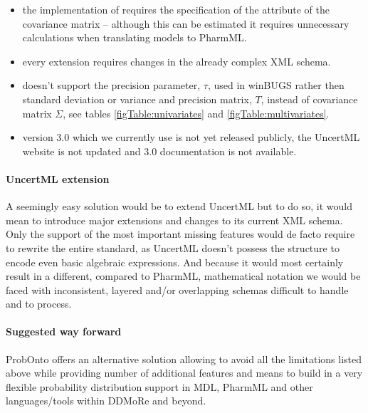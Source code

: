 \begin{itemize}
\item
the implementation of  requires the specification 
of the  attribute of the covariance matrix -- although this can be estimated
it requires unnecessary calculations when translating models to PharmML. 
\item
every extension requires changes in the already complex XML schema.
\item
doesn't support the precision parameter, $\tau$, used in winBUGS  
rather then standard deviation or variance and precision matrix, $T$, instead 
of covariance matrix $\Sigma$, see tables \ref{figTable:univariates} and \ref{figTable:multivariates}.
\item
version 3.0 which we currently use is not yet released publicly, the UncertML website 
is not updated and 3.0 documentation is not available.
\end{itemize}

\paragraph{UncertML extension} A seemingly easy solution would be to extend UncertML 
but to do so, it would mean to introduce major extensions and changes to its 
current XML schema. Only the support of the most important missing features would 
de facto require to rewrite the entire standard, as UncertML doesn't possess the 
structure to encode even basic algebraic expressions. And because it would most 
certainly result in a different, compared to PharmML, mathematical notation we would 
be faced with inconsistent, layered and/or overlapping schemas difficult to handle and 
to process.

\paragraph{Suggested way forward} ProbOnto offers an alternative solution allowing
to avoid all the limitations listed above while providing number of additional features
and means to build in a very flexible probability distribution support in MDL, PharmML 
and other languages/tools within DDMoRe and beyond. 

